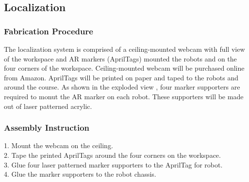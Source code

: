 
\subsection{Localization}
\label{sec:hardware_localization}

\subsubsection{Fabrication Procedure}
\label{sec:localization_fab}
The localization system is comprised of a ceiling-mounted webcam with full view of the workspace and AR markers (AprilTags) mounted the robots and on the four corners of the workspace. Ceiling-mounted webcam will be purchased online from Amazon. AprilTags will be printed on paper and taped to the robots and around the course. As shown in the exploded view , four marker supporters are required to monut the AR marker on each robot. These supporters will be made out of laser patterned acrylic. 

\subsubsection{Assembly Instruction}
\label{sec:localization_assemb}
1. Mount the webcam on the ceiling.\\
2. Tape the printed AprilTags around the four corners on the workspace.\\
3. Glue four laser patterned marker supporters to the AprilTag for robot.\\
4. Glue the marker supporters to the robot chassis. 
